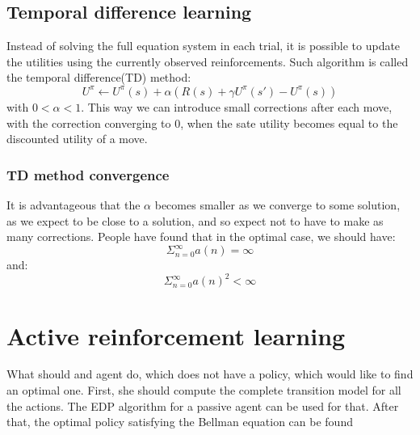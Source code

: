 \subsection{Temporal difference learning}
Instead of solving the full equation system in each trial, it is possible to update the utilities using the currently observed reinforcements. Such 
algorithm is called the temporal difference(TD) method:
\begin{equation}
    U^{\pi } \leftarrow U^{\pi }(s) + \alpha(R(s)+\gamma U^{\pi }(s')-U^{\pi }(s))
\end{equation}
with $ 0 < \alpha < 1$. This way we can introduce small corrections after each move, with the correction converging to 0, when the sate utility
becomes equal to the discounted utility of a move.
\subsubsection{TD method convergence}
It is advantageous that the $\alpha$ becomes smaller as we converge to some solution, as we expect to be close to a solution, and
so expect not to have to make as many corrections.
\nt
{
    People have found that in the optimal case, we should have:
    \begin{equation}
        \Sigma^{\infty}_{n=0}a(n) = \infty
    \end{equation}
    and:
    \begin{equation}
        \Sigma^{\infty}_{n=0}a(n)^2 < \infty
    \end{equation}
}


\section{Active reinforcement learning}
What should and agent do, which does not have a policy, which would like to find an optimal one.
First, she should compute the complete transition model for all the actions. The EDP algorithm for a passive agent can be used for that.
After that, the optimal policy satisfying the Bellman equation can be found
